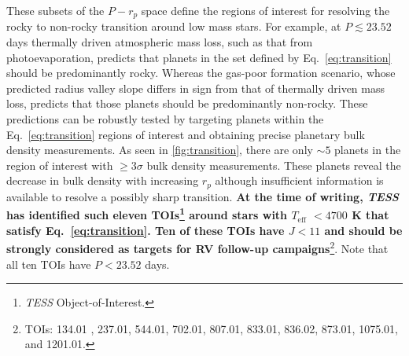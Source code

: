 \documentclass[twocolumn]{emulateapj}
\newcommand{\tess}[1]{\emph{TESS}#1}
\newcommand{\teff}[1]{$T_{\text{eff}}$#1}
\begin{document}
\noindent These subsets of the $P-r_p$ space define the regions of interest for resolving the
  rocky to non-rocky transition around low mass stars. For example, at $P\lesssim 23.52$ days thermally driven
  atmospheric mass loss, such as that from photoevaporation, predicts that planets in the set defined by
  Eq.~\ref{eq:transition} should be predominantly rocky. Whereas the gas-poor formation scenario, whose predicted
  radius valley slope differs in sign from that of thermally driven mass loss, predicts that those planets should be
  predominantly non-rocky. These predictions can be robustly tested by targeting planets within the
  Eq.~\ref{eq:transition} regions of interest and obtaining precise planetary bulk density measurements.
  As seen in \autoref{fig:transition}, there are only $\sim 5$ planets in the region of interest with $\geq 3\sigma$ bulk
  density measurements. These planets reveal the decrease in bulk density with increasing $r_p$ although insufficient
  information is available to resolve a possibly sharp transition. \textbf{At the time of writing, \tess{}
    has identified such eleven TOIs\footnote{\tess{} Object-of-Interest.}
    around stars with \teff{} $<4700$ K that satisfy Eq.~\ref{eq:transition}. Ten of these TOIs have
    $J<11$ and should be strongly considered as targets for RV follow-up campaigns}\footnote{TOIs: 134.01
    \citep{astudillodefru19}, 237.01, 544.01, 702.01, 807.01, 833.01,
    836.02, 873.01, 1075.01, and 1201.01.}. Note that all ten TOIs have $P<23.52$ days.
\end{document}
